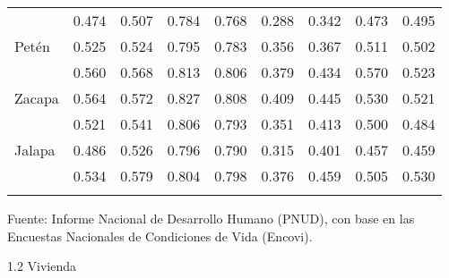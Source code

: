 {\begin{center}
\begin{tabular}{lrrrrrrrr}
			\rowcolor{color1!10!white} \multicolumn{1}{l}{Alta Verapaz}&	0.474	&	0.507	&	0.784	&	0.768	&	0.288	&	0.342	&	0.473	&	0.495	\\
			\multicolumn{1}{l}{Petén}&	0.525	&	0.524	&	0.795	&	0.783	&	0.356	&	0.367	&	0.511	&	0.502	\\
			\rowcolor{color1!10!white} \multicolumn{1}{l}{Izabal}&	0.560	&	0.568	&	0.813	&	0.806	&	0.379	&	0.434	&	0.570	&	0.523	\\
			\multicolumn{1}{l}{Zacapa}&	0.564	&	0.572	&	0.827	&	0.808	&	0.409	&	0.445	&	0.530	&	0.521	\\
			\rowcolor{color1!10!white} \multicolumn{1}{l}{Chiquimula}&	0.521	&	0.541	&	0.806	&	0.793	&	0.351	&	0.413	&	0.500	&	0.484	\\
			\multicolumn{1}{l}{Jalapa}&	0.486	&	0.526	&	0.796	&	0.790	&	0.315	&	0.401	&	0.457	&	0.459	\\
			\rowcolor{color1!10!white} \multicolumn{1}{l}{Jutiapa}&	0.534	&	0.579	&	0.804	&	0.798	&	0.376	&	0.459	&	0.505	&	0.530	\\
			\hline
			&&&&&&&&\\[-0.28cm]
		\end{tabular}\addtocounter{Cuadro}{1}
	\end{center}
	{\footnotesize Fuente: Informe Nacional de Desarrollo Humano (PNUD), con base en las Encuestas Nacionales de Condiciones de Vida (Encovi).}}


	{\Bold\Large 1.2 Vivienda}\\[-.5cm]
	
